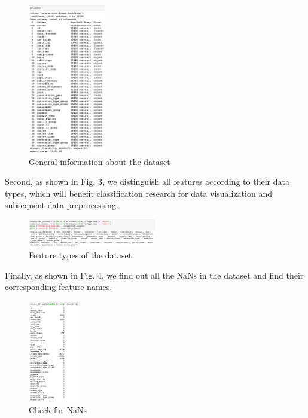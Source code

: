 \documentclass[conference]{IEEEtran}
\begin{document}
\begin{figure}[htbp]
\centerline{\includegraphics[width=0.3\textwidth]{1.pic.jpg}}
\caption{General information about the dataset}
\end{figure}

Second, as shown in Fig. 3, we distinguish all features according to their data types, which will benefit classification research for data visualization and subsequent data preprocessing.

\begin{figure}[htbp]
\centerline{\includegraphics[width=0.5\textwidth]{2.pic.jpg}}
\caption{Feature types of the dataset}
\end{figure}

Finally, as shown in Fig. 4, we find out all the NaNs in the dataset and find their corresponding feature names.

\begin{figure}[H]
\centerline{\includegraphics[width=0.2\textwidth]{3.pic.jpg}}
\caption{Check for NaNs}
\end{figure}
\end{document}

